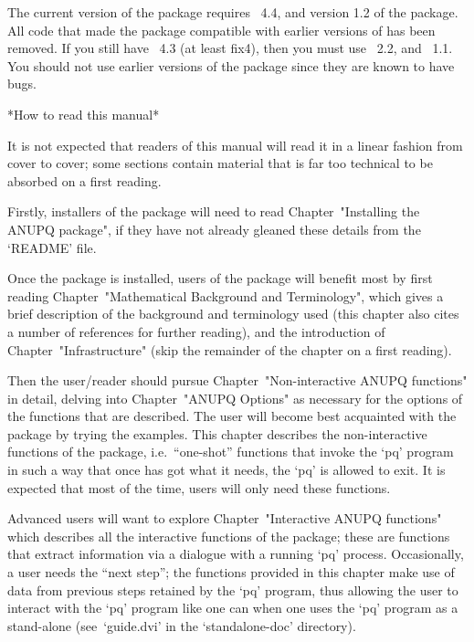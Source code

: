 \endlist


The current version of the  {\ANUPQ}  package  requires  {\GAP}~4.4,  and
version 1.2 of the {\AutPGrp} package. All code  that  made  the  package
compatible with earlier versions of {\GAP} has been removed. If you still
have {\GAP}~4.3 (at least fix4), then  you  must  use  {\ANUPQ}~2.2,  and
{\AutPGrp}~1.1. You should not  use  earlier  versions  of  the  {\ANUPQ}
package since they are known to have bugs.

*How to read this manual*

It is not expected that readers of this manual will read it in  a  linear
fashion from cover to cover; some sections contain material that  is  far
too technical to be absorbed on a first reading.

Firstly,  installers  of  the  {\ANUPQ}  package  will   need   to   read
Chapter~"Installing the ANUPQ package", if they have not already  gleaned
these details from the `README' file.

Once the {\ANUPQ} package is installed, users  of  the  {\ANUPQ}  package
will benefit most by first reading Chapter~"Mathematical  Background  and
Terminology", which gives a  brief  description  of  the  background  and
terminology used (this chapter also cites  a  number  of  references  for
further reading), and the introduction of Chapter~"Infrastructure"  (skip
the remainder of the chapter on a first reading).

Then  the  user/reader  should  pursue   Chapter~"Non-interactive   ANUPQ
functions" in detail, delving into Chapter~"ANUPQ Options"  as  necessary
for the options of the functions that are described. The user will become
best acquainted with the {\ANUPQ} package by trying  the  examples.  This
chapter describes the non-interactive functions of the {\ANUPQ}  package,
i.e.~``one-shot'' functions that invoke the `pq' program in  such  a  way
that once {\GAP} has got what it needs, the `pq' is allowed to  exit.  It
is expected that most of the time, users will only need these functions.

Advanced users will want to explore Chapter~"Interactive ANUPQ functions"
which describes all the interactive functions of  the  {\ANUPQ}  package;
these are functions that  extract  information  via  a  dialogue  with  a
running `pq' process. Occasionally, a user needs the ``next  step'';  the
functions provided in this chapter make use of data from  previous  steps
retained by the `pq' program, thus allowing the user to interact with the
`pq' program like one can when one uses the `pq' program as a stand-alone
(see~`guide.dvi' in the `standalone-doc' directory).

